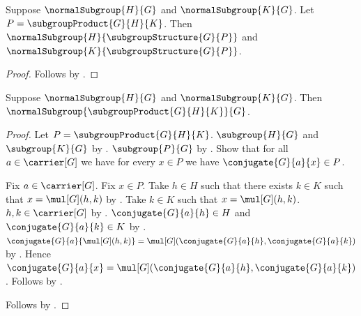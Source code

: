 \begin{theorem}\label{subgroup_product_factors_normal}
    Suppose $\normalSubgroup{H}{G}$ and $\normalSubgroup{K}{G}$.
    Let $P=\subgroupProduct{G}{H}{K}$.
    Then $\normalSubgroup{H}{\subgroupStructure{G}{P}}$ and
        $\normalSubgroup{K}{\subgroupStructure{G}{P}}$.
\end{theorem}
\begin{proof}
    Follows by
        .
\end{proof}

\begin{theorem}\label{normal_subgroup_product}
    Suppose $\normalSubgroup{H}{G}$ and $\normalSubgroup{K}{G}$.
    Then $\normalSubgroup{\subgroupProduct{G}{H}{K}}{G}$.
\end{theorem}
\begin{proof}
    Let $P=\subgroupProduct{G}{H}{K}$.
    $\subgroup{H}{G}$ and $\subgroup{K}{G}$ by
        .
    $\subgroup{P}{G}$ by .
    Show that for all $a\in\carrier[G]$ we have for every $x\in P$
        we have $\conjugate{G}{a}{x}\in P$.
    \begin{subproof}
        Fix $a\in\carrier[G]$.
        Fix $x\in P$.
        Take $h\in H$ such that there exists $k\in K$ such that
            $x=\mul[G](h,k)$ by
            .
        Take $k\in K$ such that $x=\mul[G](h,k)$.
        $h,k\in\carrier[G]$ by
            .
        $\conjugate{G}{a}{h}\in H$ and
            $\conjugate{G}{a}{k}\in K$ by
            .
        $\conjugate{G}{a}{\mul[G](h,k)}=
            \mul[G](\conjugate{G}{a}{h},
                \conjugate{G}{a}{k})$ by
            .
        Hence $\conjugate{G}{a}{x}=
            \mul[G](\conjugate{G}{a}{h},
                \conjugate{G}{a}{k})$.
        Follows by .
    \end{subproof}
    Follows by .
\end{proof}
